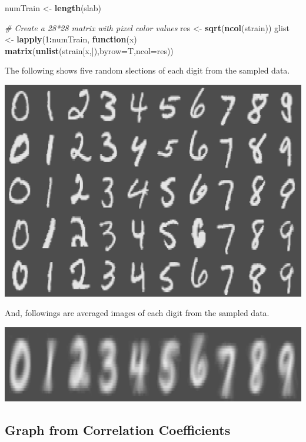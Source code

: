 \documentclass[]{article}
\newenvironment{Shaded}{\begin{snugshade}}{\end{snugshade}}
\newcommand{\KeywordTok}[1]{\textcolor[rgb]{0.13,0.29,0.53}{\textbf{#1}}}
\newcommand{\DataTypeTok}[1]{\textcolor[rgb]{0.13,0.29,0.53}{#1}}
\newcommand{\DecValTok}[1]{\textcolor[rgb]{0.00,0.00,0.81}{#1}}
\newcommand{\StringTok}[1]{\textcolor[rgb]{0.31,0.60,0.02}{#1}}
\newcommand{\CommentTok}[1]{\textcolor[rgb]{0.56,0.35,0.01}{\textit{#1}}}
\newcommand{\ControlFlowTok}[1]{\textcolor[rgb]{0.13,0.29,0.53}{\textbf{#1}}}
\newcommand{\OperatorTok}[1]{\textcolor[rgb]{0.81,0.36,0.00}{\textbf{#1}}}
\newcommand{\NormalTok}[1]{#1}
\begin{document}
\begin{Shaded}
\begin{Highlighting}[]
\NormalTok{numTrain <-}\StringTok{ }\KeywordTok{length}\NormalTok{(slab)}

\CommentTok{# Create a 28*28 matrix with pixel color values}
\NormalTok{res <-}\StringTok{ }\KeywordTok{sqrt}\NormalTok{(}\KeywordTok{ncol}\NormalTok{(strain))}
\NormalTok{glist <-}\StringTok{ }\KeywordTok{lapply}\NormalTok{(}\DecValTok{1}\OperatorTok{:}\NormalTok{numTrain, }\ControlFlowTok{function}\NormalTok{(x) }\KeywordTok{matrix}\NormalTok{(}\KeywordTok{unlist}\NormalTok{(strain[x,]),}\DataTypeTok{byrow=}\NormalTok{T,}\DataTypeTok{ncol=}\NormalTok{res))}
\end{Highlighting}
\end{Shaded}

The following shows five random slections of each digit from the sampled
data.

\includegraphics{gmmase_files/figure-latex/plotg3-1.pdf}

And, followings are averaged images of each digit from the sampled data.

\includegraphics{gmmase_files/figure-latex/plotmean-1.pdf}

\subsection{Graph from Correlation
Coefficients}\label{graph-from-correlation-coefficients}
\end{document}
